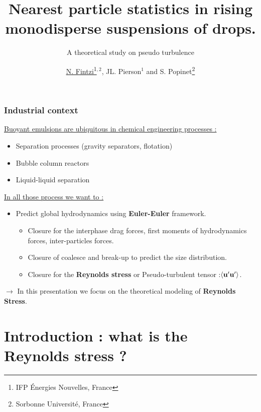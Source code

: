 \documentclass{sintefbeamer}
\title{Nearest particle statistics in rising monodisperse suspensions of drops.}
\subtitle{A theoretical study on pseudo turbulence}
\author{\href{https://scholar.google.com/citations?user=GQDBlaQAAAAJ&hl=en}{\underline{N. Fintzi}\footnote{IFP \'Energies Nouvelles, France}$^{,2}$}, JL. Pierson$^1$ and S. Popinet\footnote{Sorbonne Universit\'e, France}}
\begin{document}
\maketitle


\begin{frame}
  \frametitle{Industrial context}
  \underline{Buoyant emulsions are ubiquitous in chemical engineering processes :}
  \begin{itemize}
    \item Separation processes (gravity separators, flotation)
    \item Bubble column reactors
    \item Liquid-liquid separation
  \end{itemize}
  \vfill
  \pause
  \underline{In all those process we want to : }
  \begin{itemize}
    \item Predict global hydrodynamics using \textbf{Euler-Euler} framework. 
    \begin{itemize}
      \item Closure for the interphase drag forces, first moments of hydrodynamics forces, inter-particles forces.
      \item Closure of coalesce and break-up to predict the size distribution.
      \item Closure for the \textbf{Reynolds stress} or Pseudo-turbulent tensor :$\left<\textbf{u}'\textbf{u}'\right>$.
    \end{itemize}
  \end{itemize}
\pause
  \vfill
$\to$ In this presentation we focus on the theoretical modeling of \textbf{Reynolds Stress}.
\end{frame}

\section{Introduction : what is the Reynolds stress ?}
\end{document}
